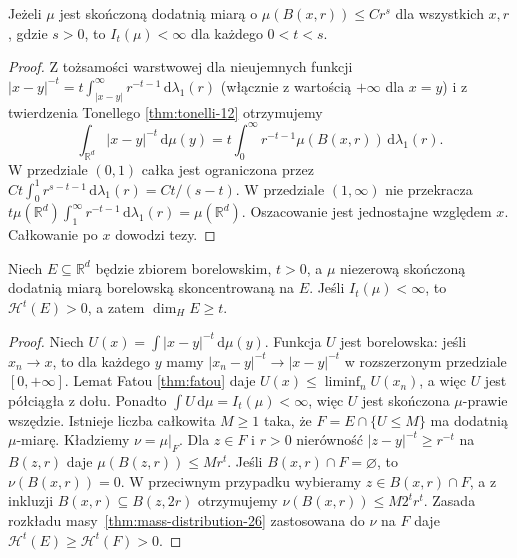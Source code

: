\begin{twierdzenie}
\label{thm:frostman-energy-26}
Jeżeli $\mu$ jest skończoną dodatnią miarą o
$\mu(B(x,r))\le Cr^s$ dla wszystkich $x,r$,
gdzie $s>0$, to $I_t(\mu)<\infty$ dla każdego
$0<t<s$.
\end{twierdzenie}
\begin{proof}
Z tożsamości warstwowej dla nieujemnych funkcji
$|x-y|^{-t}=t\int_{|x-y|}^{\infty}r^{-t-1}\,\mathrm d\lambda_1(r)$
(włącznie z wartością $+\infty$ dla $x=y$)
i z twierdzenia Tonellego \ref{thm:tonelli-12} otrzymujemy
\[
 \int_{\mathbb R^d}|x-y|^{-t}\,\mathrm d\mu(y)
 =t\int_0^\infty r^{-t-1}\mu(B(x,r))\,\mathrm d\lambda_1(r).
\]
W przedziale $(0,1)$ całka jest ograniczona przez
$Ct\int_0^1r^{s-t-1}\,\mathrm d\lambda_1(r)=Ct/(s-t)$.
W przedziale $(1,\infty)$ nie przekracza
$t\mu(\mathbb R^d)\int_1^\infty r^{-t-1}\,\mathrm d\lambda_1(r)
=\mu(\mathbb R^d)$. Oszacowanie jest jednostajne
względem $x$. Całkowanie po $x$ dowodzi tezy.
\end{proof}

\begin{twierdzenie}
\label{thm:energy-dimension-26}
Niech $E\subseteq\mathbb R^d$ będzie zbiorem borelowskim,
$t>0$, a $\mu$ niezerową skończoną dodatnią miarą
borelowską skoncentrowaną na $E$. Jeśli $I_t(\mu)<\infty$,
to $\mathcal H^t(E)>0$, a zatem $\dim_HE\ge t$.
\end{twierdzenie}
\begin{proof}
Niech $U(x)=\int|x-y|^{-t}\,\mathrm d\mu(y)$.
Funkcja $U$ jest borelowska: jeśli $x_n\to x$, to dla
każdego $y$ mamy $|x_n-y|^{-t}\to |x-y|^{-t}$
w rozszerzonym przedziale $[0,+\infty]$. Lemat Fatou
\ref{thm:fatou} daje $U(x)\le\liminf_n U(x_n)$,
a więc $U$ jest półciągła z dołu. Ponadto
$\int U\,\mathrm d\mu=I_t(\mu)<\infty$,
więc $U$ jest skończona $\mu$-prawie wszędzie.
Istnieje liczba całkowita $M\ge1$ taka, że
$F=E\cap\{U\le M\}$ ma dodatnią $\mu$-miarę.
Kładziemy $\nu=\mu|_F$. Dla $z\in F$ i $r>0$
nierówność $|z-y|^{-t}\ge r^{-t}$ na $B(z,r)$
daje $\mu(B(z,r))\le Mr^t$.
Jeśli $B(x,r)\cap F=\varnothing$, to $\nu(B(x,r))=0$.
W przeciwnym przypadku wybieramy $z\in B(x,r)\cap F$,
a z inkluzji $B(x,r)\subseteq B(z,2r)$ otrzymujemy
$\nu(B(x,r))\le M2^tr^t$.
Zasada rozkładu masy~\ref{thm:mass-distribution-26}
zastosowana do $\nu$ na $F$ daje
$\mathcal H^t(E)\ge\mathcal H^t(F)>0$.
\end{proof}

